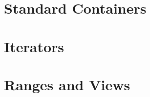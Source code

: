 \documentclass{article}
\title{\thistitle}
\author{\me}
\date{\today}
\begin{document}
\maketitle
\tableofcontents
\pagebreak

\section{Standard Containers}

\section{Iterators}

\section{Ranges and Views}
\end{document}
